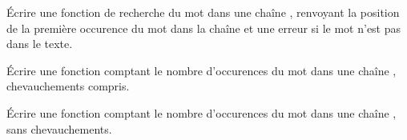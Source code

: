   \'Ecrire une fonction  de recherche du mot  dans une chaîne , renvoyant la position de la première occurence du mot dans la chaîne et une erreur si le mot n'est pas dans le texte.

  \'Ecrire une fonction  comptant le nombre d'occurences du mot  dans une chaîne , chevauchements compris.

  \'Ecrire une fonction  comptant le nombre d'occurences du mot  dans une chaîne , sans chevauchements.
